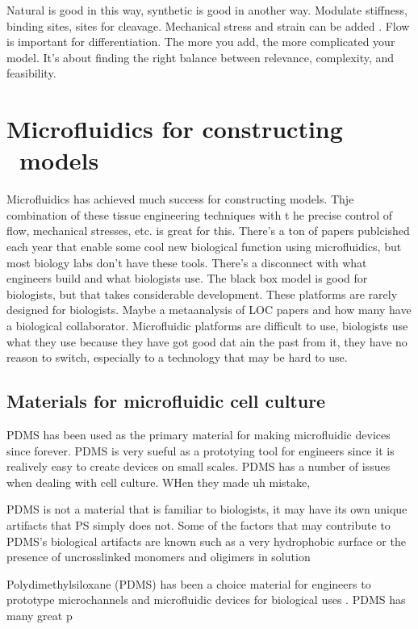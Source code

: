 Natural is good in this way, synthetic is good in another way. Modulate stiffness, binding sites, sites for cleavage. Mechanical stress and strain can be added \cite{Kim2013a}. Flow is important for differentiation. The more you add, the more complicated your model. It's about finding the right balance between relevance, complexity, and feasibility.


\section{Microfluidics for constructing \invitro\ models}
Microfluidics has achieved much success for constructing models. Thje combination of these tissue engineering techniques with t he precise control of flow, mechanical stresses, etc. is great for this. There's a ton of papers publcished each year that enable some cool new biological function using microfluidics, but most biology labs don't have these tools. There's a disconnect with what engineers build and what biologists use. The black box model is good for biologists, but that takes considerable development. These platforms are rarely designed for biologists.  Maybe a metaanalysis of LOC papers and how many have a biological collaborator. Microfluidic platforms are difficult to use, biologists use what they use because they have got good dat ain the past from it, they have no reason to switch, especially to a technology that may be hard to use.

\subsection{Materials for microfluidic cell culture}

PDMS has been used as the primary material for making microfluidic devices since forever. PDMS is very sueful as a prototying tool for engineers since it is realively easy to create devices on small scales. PDMS has a number of issues when dealing with cell culture. WHen they made uh mistake, 

PDMS is not a material that is familiar to biologists, it may have its own unique artifacts that PS simply does not. Some of the factors that may contribute to PDMS's biological artifacts are known such as a very hydrophobic surface or the presence of uncrosslinked monomers and oligimers in solution 

Polydimethylsiloxane (PDMS) has been a choice material for engineers to prototype microchannels and microfluidic devices for biological uses \cite{Sia2003a}. PDMS has many great p

